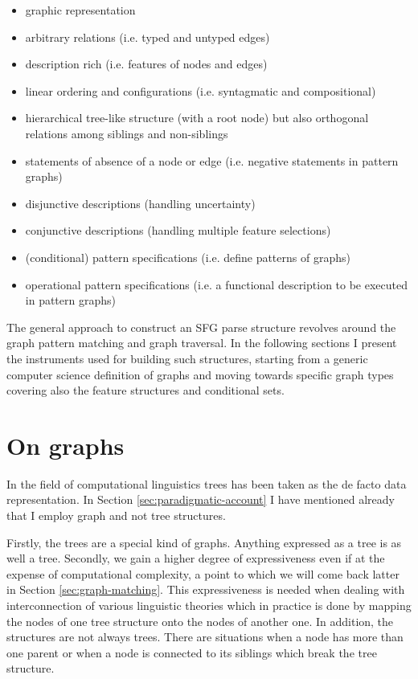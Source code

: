 \begin{itemize}
	\item graphic representation 
    \item arbitrary relations (i.e. typed and untyped edges)
	\item description rich (i.e. features of nodes and edges)
	\item linear ordering and configurations (i.e. syntagmatic and compositional)
	\item hierarchical tree-like structure (with a root node) but also orthogonal relations among siblings and non-siblings
	\item statements of absence of a node or edge (i.e. negative statements in pattern graphs)
	\item disjunctive descriptions (handling uncertainty)
	\item conjunctive descriptions (handling multiple feature selections)
	\item (conditional) pattern specifications (i.e. define patterns of graphs)
	\item operational pattern specifications (i.e. a functional description to be executed in pattern graphs)
\end{itemize}

The general approach to construct an SFG parse structure revolves around the graph pattern matching and graph traversal. In the following sections I present the instruments used for building such structures, starting from a generic computer science definition of graphs and moving towards specific graph types covering also the feature structures and conditional sets. 

\section{On graphs}
\label{sec:graphs}

In the field of computational linguistics trees has been taken as the de facto data representation. In Section \ref{sec:paradigmatic-account} I have mentioned already that I employ graph and not tree structures. 

Firstly, the trees are a special kind of graphs. Anything expressed as a tree is as well a tree. Secondly, we gain a higher degree of expressiveness even if at the expense of computational complexity, a point to which we will come back latter in Section \ref{sec:graph-matching}. This expressiveness is needed when dealing with interconnection of various linguistic theories which in practice is done by mapping the nodes of one tree structure onto the nodes of another one. In addition, the structures are not always trees. There are situations when a node has more than one parent or when a node is connected to its siblings which break the tree structure. 

